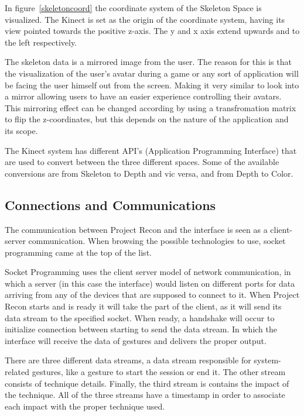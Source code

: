 In figure~\ref{skeletoncoord} the coordinate system of the Skeleton Space is visualized. The Kinect is set as the origin of the coordinate system, having its view pointed towards the positive z-axis. The y and x axis extend upwards and to the left respectively.

The skeleton data is a mirrored image from the user. The reason for this is that the visualization of the user's avatar during a game or any sort of application will be facing the user himself out from the screen. Making it very similar to look into a mirror allowing users to have an easier experience controlling their avatars. This mirroring effect can be changed according by using a transfromation matrix to flip the z-coordinates, but this depends on the nature of the application and its scope.

The Kinect system has different API's (Application Programming Interface) that are used to convert between the three different spaces. Some of the available conversions are from Skeleton to Depth and vic versa, and from Depth to Color.
\subsection{Connections and Communications}
The communication between Project Recon and the interface is seen as a client-server communication. When browsing the possible technologies to use, socket programming came at the top of the list.

Socket Programming uses the client server model of network communication, in which a server (in this case the interface) would listen on different ports for data arriving from any of the devices that are supposed to connect to it. When Project Recon starts and is ready it will take the part of the client, as it will send its data stream to the specified socket. When ready, a handshake will occur to initialize connection between starting to send the data stream. In which the interface will receive the data of gestures and delivers the proper output.

There are three different data streams, a data stream responsible for system-related gestures, like a gesture to start the session or end it. The other stream consists of technique details. Finally, the third stream is contains the impact of the technique. All of the three streams have a timestamp in order to associate each impact with the proper technique used.



